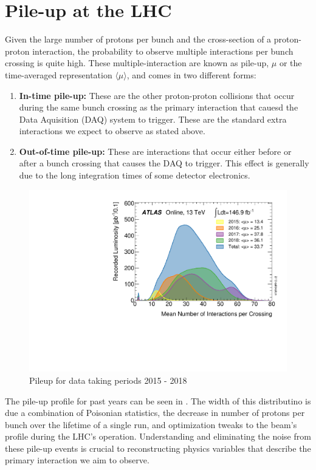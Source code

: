 \section{Pile-up at the LHC} \label{sec:lhc:pileup}

Given the large number of protons per bunch and the cross-section of a
proton-proton interaction, the probability to observe multiple interactions per
bunch crossing is quite high.  These multiple-interaction are known as pile-up,
$\mu$ or the time-averaged representation $\langle \mu \rangle$, and comes in two
different forms: 

\begin{enumerate} \item \textbf{In-time pile-up:} These are the other
proton-proton collisions that occur during the same bunch crossing as the
primary interaction that cauesd the Data Aquisition (DAQ) system to trigger.
These are the standard extra interactions we expect to observe as stated above.
\item \textbf{Out-of-time pile-up:} These are interactions that occur either
before or after a bunch crossing that causes the DAQ to trigger.  This effect is
generally due to the long integration times of some detector electronics.
\end{enumerate}

\begin{figure}[!htbp] 
  \begin{center}
    \includegraphics[width=0.9\linewidth]{figures/lhc/pileup.pdf}
    \caption{ Pileup for data taking periods 2015 - 2018} 
    \label{fig:pileup} 
  \end{center} 
\end{figure}

The pile-up profile for past years can be seen in .  The width
of this distributino is due a combination of Poisonian statistics, the decrease
in number of protons per bunch over the lifetime of a single run, and
optimization tweaks to the beam's profile during the LHC's operation.
Understanding and eliminating the noise from these pile-up events is crucial to
reconstructing physics variables that describe the primary interaction we aim
to observe.
